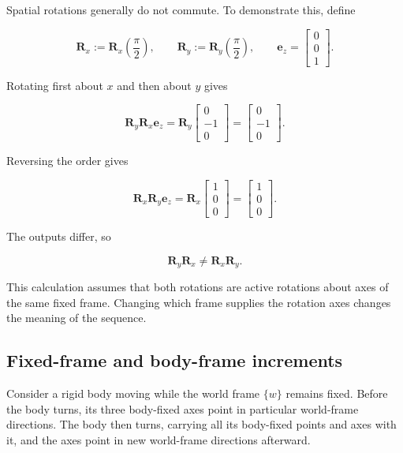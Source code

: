 \documentclass[
  australian,
  12pt,
  letterpaper,
  DIV=11,
  numbers=noendperiod,
  twoside]{scrreprt}
\begin{document}
Spatial rotations generally do not commute. To demonstrate this, define

\[
\mathbf R_x
\mathrel{:=}
\mathbf R_x\!\left(\frac{\pi}{2}\right),
\qquad
\mathbf R_y
\mathrel{:=}
\mathbf R_y\!\left(\frac{\pi}{2}\right),
\qquad
\mathbf e_z
=
\begin{bmatrix}
0\\0\\1
\end{bmatrix}.
\]

Rotating first about \(x\) and then about \(y\) gives

\[
\mathbf R_y\mathbf R_x\mathbf e_z
=
\mathbf R_y
\begin{bmatrix}
0\\-1\\0
\end{bmatrix}
=
\begin{bmatrix}
0\\-1\\0
\end{bmatrix}.
\]

Reversing the order gives

\[
\mathbf R_x\mathbf R_y\mathbf e_z
=
\mathbf R_x
\begin{bmatrix}
1\\0\\0
\end{bmatrix}
=
\begin{bmatrix}
1\\0\\0
\end{bmatrix}.
\]

The outputs differ, so

\[
\boxed{
\mathbf R_y\mathbf R_x
\ne
\mathbf R_x\mathbf R_y
}.
\]

This calculation assumes that both rotations are active rotations about
axes of the same fixed frame. Changing which frame supplies the rotation
axes changes the meaning of the sequence.

\subsection{Fixed-frame and body-frame
increments}\label{sec-so3-fixed-body-increments}

Consider a rigid body moving while the world frame \(\{w\}\) remains
fixed. Before the body turns, its three body-fixed axes point in
particular world-frame directions. The body then turns, carrying all its
body-fixed points and axes with it, and the axes point in new
world-frame directions afterward.
\end{document}
